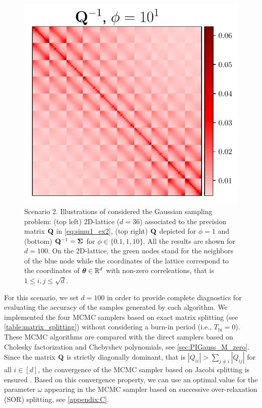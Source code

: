 \documentclass[nohypdvips,onefignum,onetabnum]{siamart171218}
\begin{document}
\begin{figure}
  \mbox{{\includegraphics[scale=0.43]{images/simu2_ex1_invA_phi_10.pdf}}}
\caption{Scenario 2. Illustrations of considered the Gaussian sampling problem: (top left) 2D-lattice ($d=36$) associated to the precision matrix $\mathbf{Q}$ in \cref{eq:simu1_ex2}, (top right) $\mathbf{Q}$ depicted for $\phi=1$ and (bottom) $\mathbf{Q}^{-1}=\mathbf{\Sigma}$ for $\phi \in \{0.1,1,10\}$. All the results are shown for $d=100$.
On the 2D-lattice, the green nodes stand for the neighbors of the blue node while the coordinates of the lattice correspond to the coordinates of $\boldsymbol{\theta} \in \mathbb{R}^d$ with non-zero correleations, that is $1\leq i,j\leq \sqrt{d}$.}
\label{fig:scenario_2_illutration_grid}
\end{figure}
%

For this scenario, we set $d = 100$ in order to provide complete diagnostics for evaluating the accuracy of the samples generated by each algorithm. 
We implemented the four MCMC samplers based on exact matrix splitting (see \cref{table:matrix_splitting}) without considering a burn-in period (i.e., $T_{\mathrm{bi}} = 0$). These MCMC algorithms are compared with the direct samplers based on Cholesky factorization and Chebyshev polynomials, see \cref{sec:PIGauss_M_zero}.
Since the matrix $\mathbf{Q}$ is strictly diagonally dominant, that is $|Q_{ii}| > \sum_{j\neq i}|Q_{ij}|$ for all $i \in [d]$, the convergence of the MCMC sampler based on Jacobi splitting is ensured \cite{Golub1989,Fox2017}.
Based on this convergence property, we can use an optimal value for the parameter $\omega$ appearing in the MCMC sampler based on successive over-relaxation (SOR) splitting, see \cref{appendix:C}. 
\end{document}
